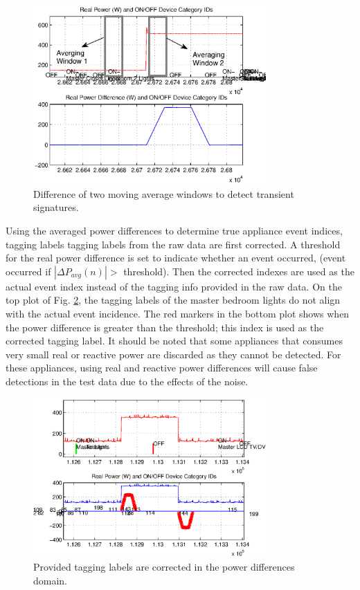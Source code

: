 \documentclass[conference]{IEEEtran}
\begin{document}
\begin{figure}[!t]
	\centering
	\includegraphics[width=3.5in]{fig/maw.eps}
	\caption{Difference of two moving average windows to detect transient signatures.}
	\label{fig:maw}
\end{figure}

Using the averaged power differences to determine true appliance event indices, tagging labels tagging labels from the raw data are first corrected.  A threshold for the real power difference is set to indicate whether an event occurred, (event occurred if $|\Delta P_{avg}(n)| >$ threshold).  Then the corrected indexes are used as the actual event index instead of the tagging info provided in the raw data.  On the top plot of Fig. \ref{fig:tagging}, the tagging labels of the master bedroom lights do not align with the actual event incidence.  The red markers in the bottom plot shows when the power difference is greater than the threshold; this index is used as the corrected tagging label.  It should be noted that some appliances that consumes very small real or reactive power are discarded as they cannot be detected.  For these appliances, using real and reactive power differences will cause false detections in the test data due to the effects of the noise. 

\begin{figure}[!t]
	\centering
	\includegraphics[width=3.5in]{fig/masterlights.eps}
	\caption{Provided tagging labels are corrected in the power differences domain.}
	\label{fig:tagging}
\end{figure}
	
\end{document}
